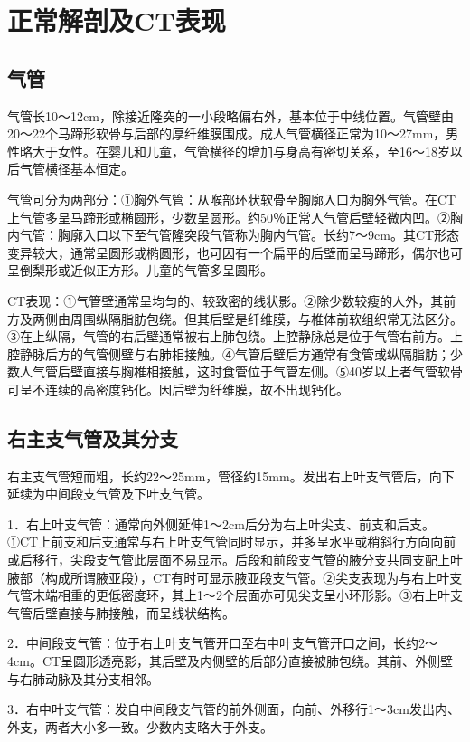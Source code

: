 \section{正常解剖及CT表现}

\subsection{气管}

气管长10～12cm，除接近隆突的一小段略偏右外，基本位于中线位置。气管壁由20～22个马蹄形软骨与后部的厚纤维膜围成。成人气管横径正常为10～27mm，男性略大于女性。在婴儿和儿童，气管横径的增加与身高有密切关系，至16～18岁以后气管横径基本恒定。

气管可分为两部分：①胸外气管：从喉部环状软骨至胸廓入口为胸外气管。在CT上气管多呈马蹄形或椭圆形，少数呈圆形。约50％正常人气管后壁轻微内凹。②胸内气管：胸廓入口以下至气管隆突段气管称为胸内气管。长约7～9cm。其CT形态变异较大，通常呈圆形或椭圆形，也可因有一个扁平的后壁而呈马蹄形，偶尔也可呈倒梨形或近似正方形。儿童的气管多呈圆形。

CT表现：①气管壁通常呈均匀的、较致密的线状影。②除少数较瘦的人外，其前方及两侧由周围纵隔脂肪包绕。但其后壁是纤维膜，与椎体前软组织常无法区分。③在上纵隔，气管的右后壁通常被右上肺包绕。上腔静脉总是位于气管右前方。上腔静脉后方的气管侧壁与右肺相接触。④气管后壁后方通常有食管或纵隔脂肪；少数人气管后壁直接与胸椎相接触，这时食管位于气管左侧。⑤40岁以上者气管软骨可呈不连续的高密度钙化。因后壁为纤维膜，故不出现钙化。

\subsection{右主支气管及其分支}

右主支气管短而粗，长约22～25mm，管径约15mm。发出右上叶支气管后，向下延续为中间段支气管及下叶支气管。

1．右上叶支气管：通常向外侧延伸1～2cm后分为右上叶尖支、前支和后支。①CT上前支和后支通常与右上叶支气管同时显示，并多呈水平或稍斜行方向向前或后移行，尖段支气管此层面不易显示。后段和前段支气管的腋分支共同支配上叶腋部（构成所谓腋亚段），CT有时可显示腋亚段支气管。②尖支表现为与右上叶支气管末端相重的更低密度环，其上1～2个层面亦可见尖支呈小环形影。③右上叶支气管后壁直接与肺接触，而呈线状结构。

2．中间段支气管：位于右上叶支气管开口至右中叶支气管开口之间，长约2～4cm。CT呈圆形透亮影，其后壁及内侧壁的后部分直接被肺包绕。其前、外侧壁与右肺动脉及其分支相邻。

3．右中叶支气管：发自中间段支气管的前外侧面，向前、外移行1～3cm发出内、外支，两者大小多一致。少数内支略大于外支。

